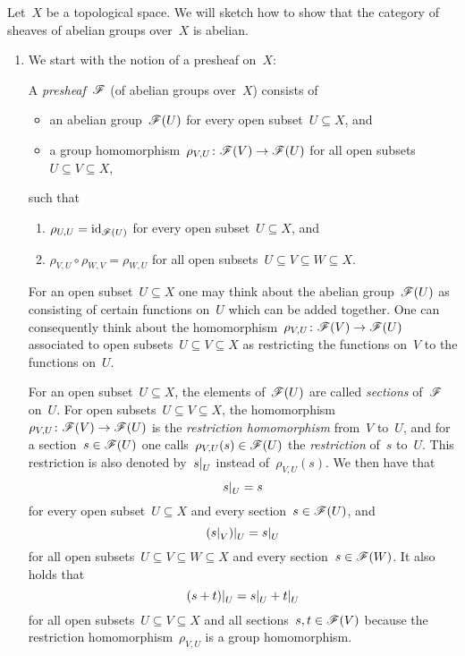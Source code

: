


\begin{example}
  Let~$X$ be a topological space.
  We will sketch how to show that the category of sheaves of abelian groups over~$X$ is abelian.
  \begin{enumerate}
    \item
      We start with the notion of a presheaf on~$X$:
      
      \begin{definitionnonum}
        A \emph{presheaf}~$\mathscr{F}$ (of abelian groups over~$X$) consists of
        \begin{itemize}
          \item
            an abelian group~$\mathscr{F}(U)$ for every open subset~$U \subseteq X$, and
          \item
            a group homomorphism~$\rho_{V,U} \colon \mathscr{F}(V) \to \mathscr{F}(U)$ for all open subsets~$U \subseteq V \subseteq X$,
        \end{itemize}
        such that
        \begin{enumerate}[label=(P\arabic*)]
          \item
            $\rho_{U,U} = \operatorname{id}_{\mathscr{F}(U)}$ for every open subset~$U \subseteq X$, and
          \item
            $\rho_{V,U} \circ \rho_{W,V} = \rho_{W,U}$ for all open subsets~$U \subseteq V \subseteq W \subseteq X$.
        \end{enumerate}
      \end{definitionnonum}
      
      For an open subset~$U \subseteq X$ one may think about the abelian group~$\mathscr{F}(U)$ as consisting of certain functions on~$U$ which can be added together.
      One can consequently think about the homomorphism~$\rho_{V,U} \colon \mathscr{F}(V) \to \mathscr{F}(U)$ associated to open subsets~$U \subseteq V \subseteq X$ as restricting the functions on~$V$ to the functions on~$U$.
      
      For an open subset~$U \subseteq X$, the elements of~$\mathscr{F}(U)$ are called \emph{sections} of~$\mathscr{F}$ on~$U$.
      For open subsets~$U \subseteq V \subseteq X$, the homomorphism~$\rho_{V,U} \colon \mathscr{F}(V) \to \mathscr{F}(U)$ is the \emph{restriction homomorphism} from~$V$ to~$U$, and for a section~$s \in \mathscr{F}(U)$ one calls~$\rho_{V,U}(s) \in \mathscr{F}(U)$ the \emph{restriction} of~$s$ to~$U$.
      This restriction is also denoted by~$\restrict{s}{U}$ instead of~$\rho_{V,U}(s)$.
      We then have that
      \[
        \restrict{s}{U} = s
      \]
      for every open subset~$U \subseteq X$ and every section~$s \in \mathscr{F}(U)$, and
      \[
        \restrict{ (\restrict{s}{V}) }{U} = \restrict{s}{U}
      \]
      for all open subsets~$U \subseteq V \subseteq W \subseteq X$ and every section~$s \in \mathscr{F}(W)$.
      It also holds that
      \[
          \restrict{(s+t)}{U}
        = \restrict{s}{U} + \restrict{t}{U}
      \]
      for all open subsets~$U \subseteq V \subseteq X$ and all sections~$s, t \in \mathscr{F}(V)$  because the restriction homomorphism~$\rho_{V,U}$ is a group homomorphism.
      

\end{enumerate}
\end{example}
